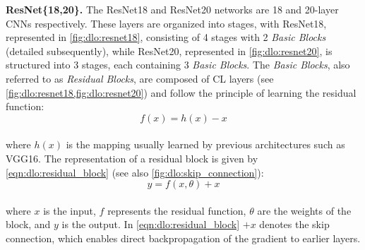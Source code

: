 \noindent \textbf{ResNet\{18,20\}.} The ResNet18 and ResNet20 networks
\cite{DBLP:conf/cvpr/HeZRS16} are 18 and 20-layer \acp{CNN} respectively. These
layers are organized into stages, with ResNet18, represented in
\cref{fig:dlo:resnet18}, consisting of 4 stages with 2 \emph{Basic Blocks}
(detailed subsequently), while ResNet20, represented in \cref{fig:dlo:resnet20},
is structured into 3 stages, each containing 3 \emph{Basic Blocks}. The
\emph{Basic Blocks}, also referred to as \emph{Residual Blocks}, are composed of
\ac{CL} layers (see \cref{fig:dlo:resnet18,fig:dlo:resnet20}) and follow the
principle of learning the residual function:\\

\begin{equation}
  f(x) = h(x) - x
\end{equation} \\

\noindent where $h(x)$ is the mapping usually learned by previous architectures
such as VGG16. The representation of a residual block is given by
\cref{eqn:dlo:residual_block} (see also \cref{fig:dlo:skip_connection}): \\

\begin{equation}
  \label{eqn:dlo:residual_block}
  y = f(x,\theta) + x
\end{equation}\\

\noindent where $x$ is the input, $f$ represents the residual function, $\theta$
are the weights of the block, and $y$ is the output. In
\cref{eqn:dlo:residual_block} $+ x$ denotes the skip connection, which enables
direct backpropagation of the gradient to earlier layers.\\

